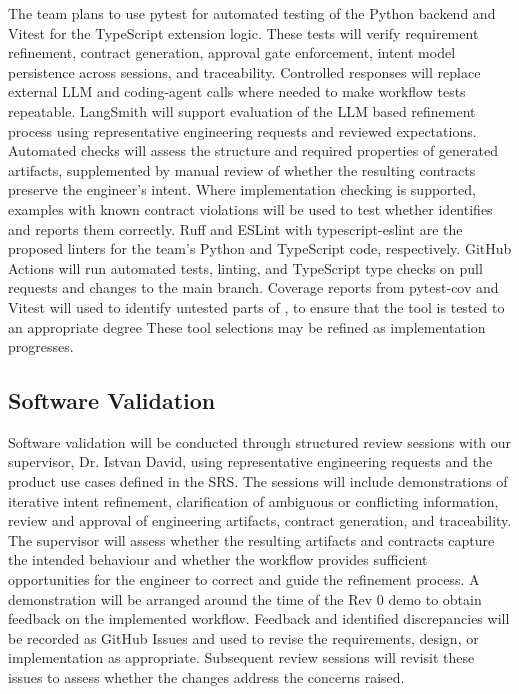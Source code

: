 \documentclass[12pt, titlepage]{article}
\begin{document}
The team plans to use pytest for automated testing of the Python backend
and Vitest for the TypeScript extension logic. These tests will verify
requirement refinement, contract generation, approval gate enforcement,
intent model persistence across sessions, and traceability. Controlled responses will
replace external LLM and coding-agent calls where needed to make workflow
tests repeatable. LangSmith will support evaluation of the LLM based
refinement process using representative engineering requests and reviewed
expectations. Automated checks will assess the structure and required
properties of generated artifacts, supplemented by manual review of
whether the resulting contracts preserve the engineer's intent. Where
implementation checking is supported, examples with known contract
violations will be used to test whether \progname{} identifies and reports
them correctly. Ruff and ESLint with typescript-eslint are the proposed
linters for the team's Python and TypeScript code, respectively.
GitHub Actions will run automated tests, linting, and TypeScript type
checks on pull requests and changes to the main branch. Coverage reports
from pytest-cov and Vitest will used to identify untested parts of \progname{}, 
to ensure that the tool is tested to an appropriate degree These tool selections
may be refined as implementation progresses.

\subsection{Software Validation}

Software validation will be conducted through structured review sessions
with our supervisor, Dr. Istvan David, using representative engineering
requests and the product use cases defined in the SRS. The sessions will
include demonstrations of iterative intent refinement, clarification of
ambiguous or conflicting information, review and approval of engineering
artifacts, contract generation, and traceability. The supervisor will
assess whether the resulting artifacts and contracts capture the intended
behaviour and whether the workflow provides sufficient opportunities for
the engineer to correct and guide the refinement process. A demonstration
will be arranged around the time of the Rev 0 demo to obtain feedback on the
implemented workflow. Feedback and identified discrepancies will be
recorded as GitHub Issues and used to revise the requirements, design,
or implementation as appropriate. Subsequent review sessions will revisit
these issues to assess whether the changes address the concerns raised.
\end{document}
